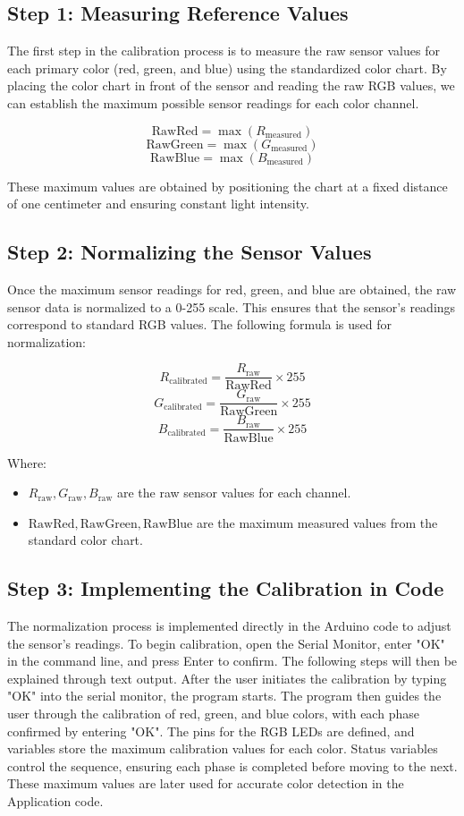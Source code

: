 \subsection{Step 1: Measuring Reference Values}
The first step in the calibration process is to measure the raw sensor values for each primary color (red, green, and blue) using the standardized color chart. By placing the color chart in front of the sensor and reading the raw RGB values, we can establish the maximum possible sensor readings for each color channel.

\[
\text{RawRed} = \max(R_{\text{measured}})
\]
\[
\text{RawGreen} = \max(G_{\text{measured}})
\]
\[
\text{RawBlue} = \max(B_{\text{measured}})
\]

These maximum values are obtained by positioning the chart at a fixed distance of one centimeter and ensuring constant light intensity.

\subsection{Step 2: Normalizing the Sensor Values}
Once the maximum sensor readings for red, green, and blue are obtained, the raw sensor data is normalized to a 0-255 scale. This ensures that the sensor's readings correspond to standard RGB values. The following formula is used for normalization:

\[
R_{\text{calibrated}} = \frac{R_{\text{raw}}}{\text{RawRed}} \times 255
\]
\[
G_{\text{calibrated}} = \frac{G_{\text{raw}}}{\text{RawGreen}} \times 255
\]
\[
B_{\text{calibrated}} = \frac{B_{\text{raw}}}{\text{RawBlue}} \times 255
\]

Where:
\begin{itemize}
	\item $R_{\text{raw}}, G_{\text{raw}}, B_{\text{raw}}$ are the raw sensor values for each channel.
	\item $\text{RawRed}, \text{RawGreen}, \text{RawBlue}$ are the maximum measured values from the standard color chart.
\end{itemize}

\subsection{Step 3: Implementing the Calibration in Code}
The normalization process is implemented directly in the Arduino code to adjust the sensor's readings. To begin calibration, open the Serial Monitor, enter "OK" in the command line, and press Enter to confirm. The following steps will then be explained through text output.
\medskip
After the user initiates the calibration by typing "OK" into the serial monitor, the program starts. The program then guides the user through the calibration of red, green, and blue colors, with each phase confirmed by entering "OK". The pins for the RGB LEDs are defined, and variables store the maximum calibration values for each color. Status variables control the sequence, ensuring each phase is completed before moving to the next. These maximum values are later used for accurate color detection in the Application code.

